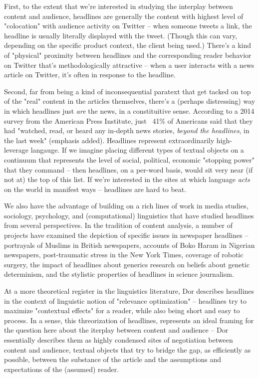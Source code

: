 \documentclass{scrartcl}
\begin{document}
First, to the extent that we're interested in studying the interplay between content and audience, headlines are generally the content with highest level of "colocation" with audience activity on Twitter -- when someone tweets a link, the headline is usually literally displayed with the tweet. (Though this can vary, depending on the specific product context, the client being used.) There's a kind of "physical" proximity between headlines and the corresponding reader behavior on Twitter that's methodologically attractive -- when a user interacts with a news article on Twitter, it's often in response to the headline.

Second, far from being a kind of inconsequential paratext that get tacked on top of the "real" content in the articles themselves, there's a (perhaps distressing) way in which headlines just \textit{are} the news, in a constituitive sense. According to a 2014 survey from the American Press Institute, just ~41\% of Americans said that they had "watched, read, or heard any in-depth news stories, \textit{beyond the headlines}, in the last week" (emphasis added).\cite{api2014rational} Headlines represent extraordinarily high-leverage langauge. If we imagine placing different types of textual objects on a continuum that represents the level of social, political, economic "stopping power" that they command -- then headlines, on a per-word basis, would sit very near (if not at) the top of this list. If we're interested in the sites at which language \textit{acts} on the world in manifest ways -- headlines are hard to beat.

We also have the advantage of building on a rich lines of work in media studies, sociology, psychology, and (computational) linguistics that have studied headlines from several perspectives. In the tradition of content analysis, a number of projects have examined the depiction of specific issues in newspaper headlines -- portrayals of Muslims in British newspapers,\cite{bleich2015media} accounts of Boko Haram in Nigerian newspapers,\cite{abba2015speech} post-traumatic stress in the New York Times,\cite{purtle2016calculating} coverage of robotic surgery,\cite{ficko2017high} the impact of headlines about generics research on beliefs about genetic determinism,\cite{condit2001exploratory} and the stylistic properties of headlines in science journalism.\cite{molek2017stylistic}

At a more theoretical register in the linguistics literature, Dor\cite{dor2003newspaper} describes headlines in the context of linguistic notion of "relevance optimization" -- headlines try to maximize "contextual effects" for a reader, while also being short and easy to process. In a sense, this threorization of headlines, represents an ideal framing for the question here about the iterplay between content and audience -- Dor essentially describes them as highly condensed sites of negotiation between content and audience, textual objects that try to bridge the gap, as efficiently as possible, between the substance of the article and the assumptions and expectations of the (assumed) reader.
\end{document}
